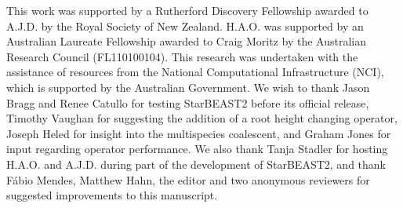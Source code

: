 \documentclass[nogrid]{MBE}%
\begin{document}
This work was supported by a Rutherford Discovery Fellowship awarded to A.J.D.
by the Royal Society of New Zealand. H.A.O. was supported by an Australian
Laureate Fellowship awarded to Craig Moritz by the Australian Research Council
(FL110100104). This research was undertaken with the assistance of resources
from the National Computational Infrastructure (NCI), which is supported by
the Australian Government. We wish to thank Jason Bragg and Renee Catullo for
testing StarBEAST2 before its official release, Timothy Vaughan for suggesting
the addition of a root height changing operator, Joseph Heled for insight into
the multispecies coalescent, and Graham Jones for input regarding operator
performance. We also thank Tanja Stadler for hosting H.A.O. and A.J.D. during
part of the development of StarBEAST2, and thank F\'abio Mendes, Matthew Hahn,
the editor and two anonymous reviewers for suggested improvements to this
manuscript.

\end{document}
